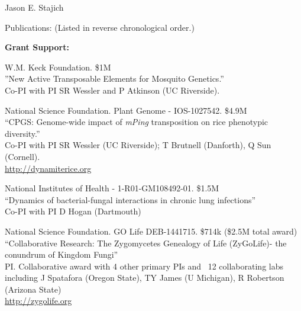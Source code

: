 \documentclass[10pt]{article}
\begin{document}
\begin{cv}{\centerline{Jason E. Stajich}}
\begin{cvlist}{Publications: (Listed in reverse chronological order.)}
\end{cvlist}
\setlength{\cvlabelwidth}{24mm}


\begin{cvlistcompact}{\bf Grant Support:}
\item [{\bf Ongoing support}]

\item [2011-2016] W.M. Keck Foundation. \$1M \\
''New Active Transposable Elements for Mosquito Genetics.'' \\
Co-PI with PI SR Wessler and P Atkinson (UC Riverside). 

\item [2011-2017] National Science Foundation. Plant Genome -
  IOS-1027542. \$4.9M  \\
  ``CPGS: Genome-wide impact of \textit{mPing} transposition on rice phenotypic diversity.'' \\
Co-PI with PI SR Wessler (UC Riverside); T Brutnell (Danforth), Q Sun
(Cornell). \\
\url{http://dynamiterice.org}

\item [2014-2017] National Institutes of Health - 1-R01-GM108492-01. \$1.5M \\
``Dynamics of bacterial-fungal interactions in chronic lung infections'' \\
Co-PI with PI D Hogan (Dartmouth)

\item [2015-2018] National Science Foundation. GO Life
  DEB-1441715. \$714k (\$2.5M total award) \\
``Collaborative Research: The Zygomycetes Genealogy of Life
  (ZyGoLife)- the conundrum of Kingdom Fungi'' \\
  PI. Collaborative award with 4 other primary PIs and ~12
  collaborating labs including J Spatafora (Oregon State), TY James (U
  Michigan), R Robertson (Arizona State) \\
\url{http://zygolife.org} 


\end{cvlistcompact}
\end{cv}
\end{document}
